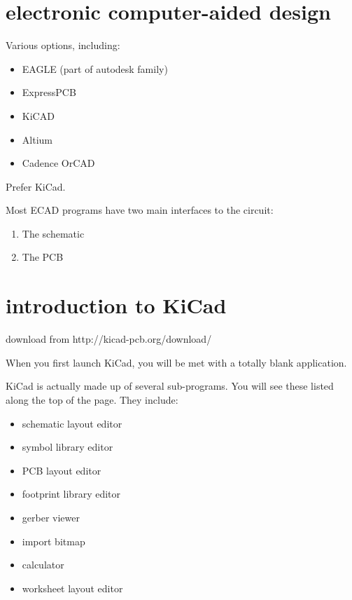 \documentclass{training}
\begin{document}







\clearpage
\section{electronic computer-aided design}

Various options, including:
\begin{itemize}
  \item EAGLE (part of autodesk family)
  \item ExpressPCB
  \item KiCAD
  \item Altium
  \item Cadence OrCAD
\end{itemize}
Prefer KiCad.

Most ECAD programs have two main interfaces to the circuit:
\begin{enumerate}
  \item The schematic
  \item The PCB
\end{enumerate}

\clearpage
\section{introduction to KiCad}

download from http://kicad-pcb.org/download/

When you first launch KiCad, you will be met with a totally blank application.

KiCad is actually made up of several sub-programs.
You will see these listed along the top of the page.
They include:
\begin{itemize}
  \item schematic layout editor
  \item symbol library editor
  \item PCB layout editor
  \item footprint library editor
  \item gerber viewer
  \item import bitmap
  \item calculator
  \item worksheet layout editor
\end{itemize}
\end{document}
